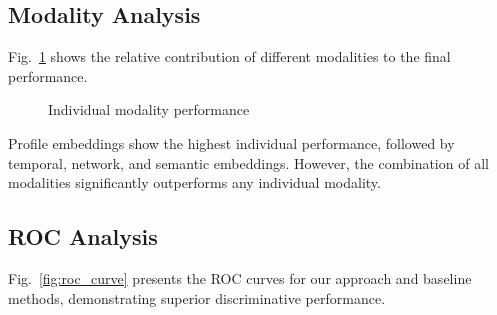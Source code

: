 \documentclass[conference]{IEEEtran}
\begin{document}
\subsection{Modality Analysis}
Fig.~\ref{fig:modality_contribution} shows the relative contribution of different modalities to the final performance.

\begin{figure}[t]
\centering
{}
\caption{Individual modality performance}
\label{fig:modality_contribution}
\end{figure}

Profile embeddings show the highest individual performance, followed by temporal, network, and semantic embeddings. However, the combination of all modalities significantly outperforms any individual modality.

\subsection{ROC Analysis}
Fig.~\ref{fig:roc_curve} presents the ROC curves for our approach and baseline methods, demonstrating superior discriminative performance.
\end{document}
